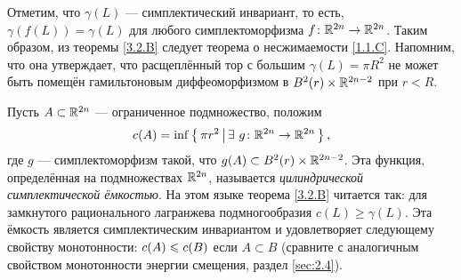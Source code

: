 \begin{ex}{}\label{3.2.E}
Отметим, что $\gamma (L)$ — симплектический инвариант, то есть, $\gamma (f (L)) = \gamma (L)$ для любого симплектоморфизма $f\colon \mathbb{R}^{2n} \to \mathbb{R}^{2n}$.
Таким образом, из теоремы \ref{3.2.B} следует теорема о несжимаемости \ref{1.1.C}.
Напомним, что она утверждает, что расщеплённый тор с большим $\gamma (L) = \pi R^2$ не может быть помещён гамильтоновым диффеоморфизмом в $B^2 (r) \times \mathbb{R}^{2n - 2}$ при $r<R$.
\end{ex}

\begin{ex}{}\label{3.2.F}
Пусть $A \subset \mathbb{R}^{2n}$ — ограниченное подмножество, положим 
\[c(A) = \inf \left\{ \,{\pi r^2}\, \middle| \,{ \exists\  g\colon \mathbb{R}^{2n} \to \mathbb{R}^{2n}}\, \right\},\]
где $g$ — симплектоморфизм такой, что $g (A) \subset B^2 (r) \times \mathbb{R}^{2n - 2}$.
Эта функция, определённая на подмножествах $\mathbb{R}^{2n}$, называется \emph{цилиндрической симплектической ёмкостью}.
На этом языке теорема \ref{3.2.B} читается так:
для замкнутого рационального лагранжева подмногообразия $c(L) \ge \gamma (L)$.
Эта ёмкость является симплектическим инвариантом и удовлетворяет следующему свойству монотонности:
$c (A) \z\le c (B)$ если $A \subset B$ (сравните с аналогичным свойством
монотонности энергии смещения, раздел \ref{sec:2.4}).
\end{ex}



